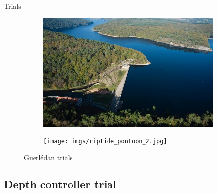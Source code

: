 \documentclass[10pt, xcolor={usenames, dvipsnames}]{beamer}
\begin{document}
\begin{frame}{Trials}
\begin{minipage}[c]{.43\textwidth}
\begin{figure}
\begin{subfigure}[t]{.9\textwidth}
                            \centering
                            \includegraphics[width=\textwidth,trim={0 1cm 0 0.8cm},clip]{imgs/lac-de-guerledan.jpg}
                        \end{subfigure}
                        \hfill
                        \begin{subfigure}[t]{.9\textwidth}
                            \centering
                            \texttt{[image: imgs/riptide\_pontoon\_2.jpg]}
                        \end{subfigure}
                        \caption{Guerlédan trials}
                    \end{figure}
                \end{minipage}
            \end{frame}

        \subsection{Depth controller trial}
\end{document}
